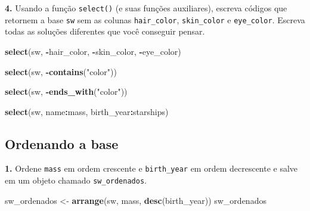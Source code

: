 \documentclass[
]{book}
\newenvironment{Shaded}{\begin{snugshade}}{\end{snugshade}}
\newcommand{\FunctionTok}[1]{\textcolor[rgb]{0.13,0.29,0.53}{\textbf{#1}}}
\newcommand{\NormalTok}[1]{#1}
\newcommand{\OtherTok}[1]{\textcolor[rgb]{0.56,0.35,0.01}{#1}}
\newcommand{\SpecialCharTok}[1]{\textcolor[rgb]{0.81,0.36,0.00}{\textbf{#1}}}
\newcommand{\StringTok}[1]{\textcolor[rgb]{0.31,0.60,0.02}{#1}}
\begin{document}
\textbf{4.} Usando a função \texttt{select()} (e suas funções auxiliares), escreva
códigos que retornem a base \texttt{sw} sem as colunas \texttt{hair\_color},
\texttt{skin\_color} e \texttt{eye\_color}. Escreva todas as soluções diferentes que
você conseguir pensar.

\begin{Shaded}
\begin{Highlighting}[]
\FunctionTok{select}\NormalTok{(sw, }\SpecialCharTok{{-}}\NormalTok{hair\_color, }\SpecialCharTok{{-}}\NormalTok{skin\_color, }\SpecialCharTok{{-}}\NormalTok{eye\_color)}

\FunctionTok{select}\NormalTok{(sw, }\SpecialCharTok{{-}}\FunctionTok{contains}\NormalTok{(}\StringTok{"color"}\NormalTok{))}

\FunctionTok{select}\NormalTok{(sw, }\SpecialCharTok{{-}}\FunctionTok{ends\_with}\NormalTok{(}\StringTok{"color"}\NormalTok{))}

\FunctionTok{select}\NormalTok{(sw, name}\SpecialCharTok{:}\NormalTok{mass, birth\_year}\SpecialCharTok{:}\NormalTok{starships)}
\end{Highlighting}
\end{Shaded}

\subsection{Ordenando a base}\label{ordenando-a-base}

\textbf{1.} Ordene \texttt{mass} em ordem crescente e \texttt{birth\_year} em ordem
decrescente e salve em um objeto chamado \texttt{sw\_ordenados}.

\begin{Shaded}
\begin{Highlighting}[]
\NormalTok{sw\_ordenados }\OtherTok{\textless{}{-}} \FunctionTok{arrange}\NormalTok{(sw, mass, }\FunctionTok{desc}\NormalTok{(birth\_year))}
\NormalTok{sw\_ordenados}
\end{Highlighting}
\end{Shaded}
\end{document}
